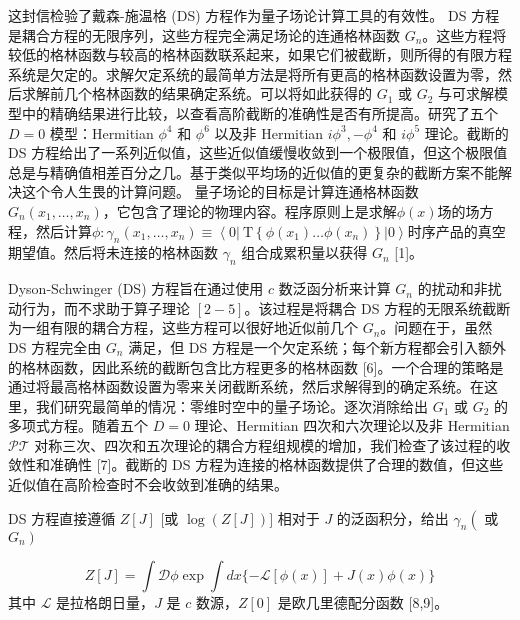 \documentclass[UTF8]{ctexart}
\begin{document}
这封信检验了戴森-施温格 (DS) 方程作为量子场论计算工具的有效性。 DS 方程是耦合方程的无限序列，这些方程完全满足场论的连通格林函数 \( G_{n} \)。这些方程将较低的格林函数与较高的格林函数联系起来，如果它们被截断，则所得的有限方程系统是欠定的。求解欠定系统的最简单方法是将所有更高的格林函数设置为零，然后求解前几个格林函数的结果确定系统。可以将如此获得的 \( G_{1} \) 或 \( G_{2} \) 与可求解模型中的精确结果进行比较，以查看高阶截断的准确性是否有所提高。研究了五个 \( D=0 \) 模型：Hermitian \( \phi^{4} \) 和 \( \phi^{6} \) 以及非 Hermitian \( i \phi^{3},-\phi^{4} \) 和 \( i \phi^{5} \) 理论。截断的 DS 方程给出了一系列近似值，这些近似值缓慢收敛到一个极限值，但这个极限值总是与精确值相差百分之几。基于类似平均场的近似值的更复杂的截断方案不能解决这个令人生畏的计算问题。
量子场论的目标是计算连通格林函数\( G_{n}\left(x_{1}, \ldots, x_{n}\right) \)，它包含了理论的物理内容。程序原则上是求解\( \phi(x) \)场的场方程，然后计算\( \phi: \gamma_{n}\left(x_{1}, \ldots, x_{n}\right) \equiv\left\langle 0\left|\mathrm{~T}\left\{\phi\left(x_{1}\right) \ldots \phi\left(x_{n}\right)\right\}\right| 0\right\rangle \)时序产品的真空期望值。然后将未连接的格林函数 \( \gamma_{n} \) 组合成累积量以获得 \( G_{n} \) [1]。

Dyson-Schwinger (DS) 方程旨在通过使用 \( c \) 数泛函分析来计算 \( G_{n} \) 的扰动和非扰动行为，而不求助于算子理论 \( [2-5] \)。该过程是将耦合 DS 方程的无限系统截断为一组有限的耦合方程，这些方程可以很好地近似前几个 \( G_{n} \)。问题在于，虽然 DS 方程完全由 \( G_{n} \) 满足，但 DS 方程是一个欠定系统；每个新方程都会引入额外的格林函数，因此系统的截断包含比方程更多的格林函数 [6]。一个合理的策略是通过将最高格林函数设置为零来关闭截断系统，然后求解得到的确定系统。在这里，我们研究最简单的情况：零维时空中的量子场论。逐次消除给出 \( G_{1} \) 或 \( G_{2} \) 的多项式方程。随着五个 \( D=0 \) 理论、Hermitian 四次和六次理论以及非 Hermitian \( \mathcal{P T} \) 对称三次、四次和五次理论的耦合方程组规模的增加，我们检查了该过程的收敛性和准确性 [7]。截断的 DS 方程为连接的格林函数提供了合理的数值，但这些近似值在高阶检查时不会收敛到准确的结果。



DS 方程直接遵循 \( Z[J] \) [或 \( \log (Z[J])] \) 相对于 \( J \) 的泛函积分，给出 \( \gamma_{n}\left(\right. \) 或 \( \left.G_{n}\right) \)


\[
Z[J]=\int \mathcal{D} \phi \exp \int d x\{-\mathcal{L}[\phi(x)]+J(x) \phi(x)\}
\] 其中 \( \mathcal{L} \) 是拉格朗日量，\( J \) 是 \( c \) 数源，\( Z[0] \) 是欧几里德配分函数 [8,9]。
\end{document}
